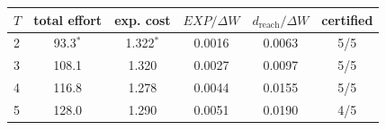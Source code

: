 \begin{tabular}{lccccc}
\toprule
$T$ & total effort & exp. cost & $EXP/\Delta W$ & $d_{\text{reach}}/\Delta W$ & certified \\
\midrule
2 & 93.3$^\ast$ & 1.322$^\ast$ & 0.0016 & 0.0063 & 5/5 \\
3 & 108.1 & 1.320 & 0.0027 & 0.0097 & 5/5 \\
4 & 116.8 & 1.278 & 0.0044 & 0.0155 & 5/5 \\
5 & 128.0 & 1.290 & 0.0051 & 0.0190 & 4/5 \\
\bottomrule
\end{tabular}
